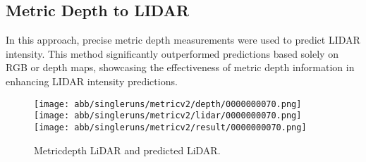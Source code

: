 \subsection{Metric Depth to LIDAR}

In this approach, precise metric depth measurements were used to predict LIDAR intensity. This method significantly outperformed predictions based solely on RGB or depth maps, showcasing the effectiveness of metric depth information in enhancing LIDAR intensity predictions.
\begin{figure}[!ht]
	\centering
	\texttt{[image: abb/singleruns/metricv2/depth/0000000070.png]}
	\texttt{[image: abb/singleruns/metricv2/lidar/0000000070.png]}
	\texttt{[image: abb/singleruns/metricv2/result/0000000070.png]}
	\caption{Metricdepth LiDAR and predicted LiDAR.}
	\label{depth}
\end{figure}

